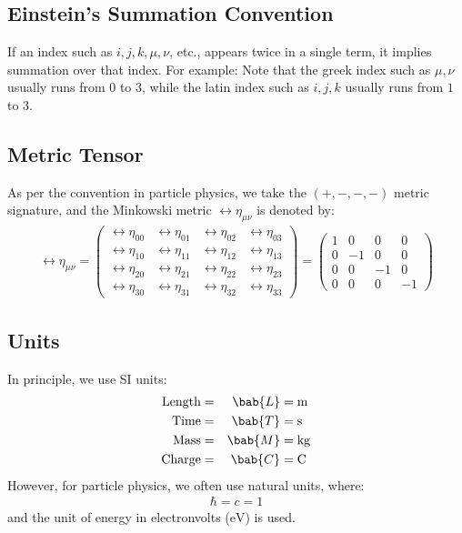 \subsection{Einstein's Summation Convention}
If an index such as $i, j, k, \mu, \nu$, etc., appears twice in a single term, it implies summation over that index. For example:
Note that the greek index such as $\mu, \nu$ usually runs from $0$ to $3$, while the latin index such as $i, j, k$ usually runs from $1$ to $3$.

\subsection{Metric Tensor}
As per the convention in particle physics, we take the $(+, -, -, -)$ metric signature, and the Minkowski metric $\rel{\eta}_{\mu \nu}$ is denoted by:
\begin{align}
  \rel{\eta}_{\mu \nu}
  = \begin{pmatrix}
      \rel{\eta}_{00} & \rel{\eta}_{01} & \rel{\eta}_{02} & \rel{\eta}_{03} \\
      \rel{\eta}_{10} & \rel{\eta}_{11} & \rel{\eta}_{12} & \rel{\eta}_{13} \\
      \rel{\eta}_{20} & \rel{\eta}_{21} & \rel{\eta}_{22} & \rel{\eta}_{23} \\
      \rel{\eta}_{30} & \rel{\eta}_{31} & \rel{\eta}_{32} & \rel{\eta}_{33}
    \end{pmatrix}
  = \begin{pmatrix}
      1 & 0  & 0  & 0  \\
      0 & -1 & 0  & 0  \\
      0 & 0  & -1 & 0  \\
      0 & 0  & 0  & -1
    \end{pmatrix}
\end{align}

\subsection{Units}
In principle, we use SI units:
\begin{alignat}{2}
  \text{Length} & = & \bab{L} & = \si{\meter}    \\
  \text{Time}   & = & \bab{T} & = \si{\second}   \\
  \text{Mass}   & = & \bab{M} & = \si{\kilogram} \\
  \text{Charge} & = & \bab{C} & = \si{\coulomb}
\end{alignat}
However, for particle physics, we often use natural units, where:
\begin{align}
  \hbar = c = 1
\end{align}
and the unit of energy in electronvolts ($\si{\electronvolt}$) is used.